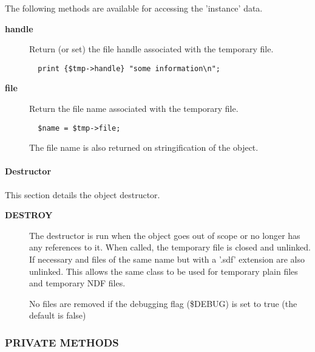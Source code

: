 The following methods are available for accessing the
'instance' data.

\begin{description}

\item[{\textbf{handle}}] \mbox{}

Return (or set) the file handle associated with the temporary
file.

\begin{verbatim}
  print {$tmp->handle} "some information\n";
\end{verbatim}

\item[{\textbf{file}}] \mbox{}

Return the file name associated with the temporary file.

\begin{verbatim}
  $name = $tmp->file;
\end{verbatim}


The file name is also returned on stringification of the object.

\end{description}
\paragraph*{Destructor\label{ORAC::TempFile_Destructor}}


This section details the object destructor.

\begin{description}

\item[{\textbf{DESTROY}}] \mbox{}

The destructor is run when the object goes out of scope
or no longer has any references to it. When called, the
temporary file is closed and unlinked. If necessary
and files of the same name but with a '.sdf' extension
are also unlinked. This allows the same class to be used
for temporary plain files and temporary NDF files.



No files are removed if the debugging flag (\$DEBUG) is set to
true (the default is false)

\end{description}
\subsubsection*{PRIVATE METHODS\label{ORAC::TempFile_PRIVATE_METHODS}}


